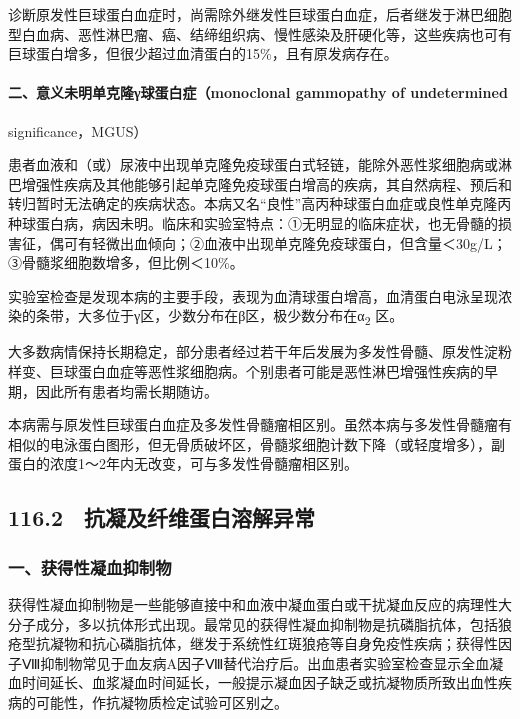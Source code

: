 诊断原发性巨球蛋白血症时，尚需除外继发性巨球蛋白血症，后者继发于淋巴细胞型白血病、恶性淋巴瘤、癌、结缔组织病、慢性感染及肝硬化等，这些疾病也可有巨球蛋白增多，但很少超过血清蛋白的15\%，且有原发病存在。

\paragraph{二、意义未明单克隆γ球蛋白症（monoclonal gammopathy of undetermined}
significance，MGUS）

患者血液和（或）尿液中出现单克隆免疫球蛋白式轻链，能除外恶性浆细胞病或淋巴增强性疾病及其他能够引起单克隆免疫球蛋白增高的疾病，其自然病程、预后和转归暂时无法确定的疾病状态。本病又名“良性”高丙种球蛋白血症或良性单克隆丙种球蛋白病，病因未明。临床和实验室特点：①无明显的临床症状，也无骨髓的损害征，偶可有轻微出血倾向；②血液中出现单克隆免疫球蛋白，但含量＜30g/L；③骨髓浆细胞数增多，但比例＜10\%。

实验室检查是发现本病的主要手段，表现为血清球蛋白增高，血清蛋白电泳呈现浓染的条带，大多位于γ区，少数分布在β区，极少数分布在α\textsubscript{2}
区。

大多数病情保持长期稳定，部分患者经过若干年后发展为多发性骨髓、原发性淀粉样变、巨球蛋白血症等恶性浆细胞病。个别患者可能是恶性淋巴增强性疾病的早期，因此所有患者均需长期随访。

本病需与原发性巨球蛋白血症及多发性骨髓瘤相区别。虽然本病与多发性骨髓瘤有相似的电泳蛋白图形，但无骨质破坏区，骨髓浆细胞计数下降（或轻度增多），副蛋白的浓度1～2年内无改变，可与多发性骨髓瘤相区别。

\protect\hypertarget{text00266.html}{}{}

\subsection{116.2　抗凝及纤维蛋白溶解异常}

\subsubsection{一、获得性凝血抑制物}

获得性凝血抑制物是一些能够直接中和血液中凝血蛋白或干扰凝血反应的病理性大分子成分，多以抗体形式出现。最常见的获得性凝血抑制物是抗磷脂抗体，包括狼疮型抗凝物和抗心磷脂抗体，继发于系统性红斑狼疮等自身免疫性疾病；获得性因子Ⅷ抑制物常见于血友病A因子Ⅷ替代治疗后。出血患者实验室检查显示全血凝血时间延长、血浆凝血时间延长，一般提示凝血因子缺乏或抗凝物质所致出血性疾病的可能性，作抗凝物质检定试验可区别之。

